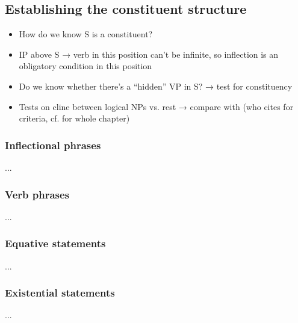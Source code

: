 \subsection{Establishing the constituent structure}

\begin{itemize}
	\item How do we know S is a constituent?
	\item IP above S → verb in this position can't be infinite, so inflection 
		is an obligatory condition in this position
	\item Do we know whether there's a ``hidden'' VP in S? → test for 
		constituency
	\item Tests on cline between logical \Subj{} NPs vs. rest → compare
		with \textcites[112]{kroeger1991} (who cites \cite[137]{speas1990}
		for criteria, cf. \citet[123--201]{speas1990} for whole chapter)
\end{itemize}

\subsubsection{Inflectional phrases}
\label{subsubsec:ips}

...

\subsubsection{Verb phrases}
\label{subsubsec:vps}

...

\subsubsection{Equative statements}
\label{subsubsec:eqs}

...

\subsubsection{Existential statements}
\label{subsubsec:exs}

...









